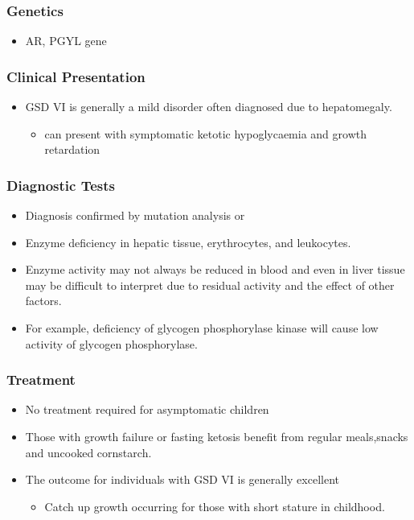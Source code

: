 \documentclass{scrartcl}
\begin{document}
\subsubsection{Genetics}
\label{sec:org5af2592}
\begin{itemize}
\item AR, PGYL gene
\end{itemize}

\subsubsection{Clinical Presentation}
\label{sec:org1d8daf8}
\begin{itemize}
\item GSD VI is generally a mild disorder often diagnosed due to hepatomegaly.
\begin{itemize}
\item can present with symptomatic ketotic hypoglycaemia and growth retardation
\end{itemize}
\end{itemize}
\subsubsection{Diagnostic Tests}
\label{sec:orgbe826e9}
\begin{itemize}
\item Diagnosis confirmed by mutation analysis or
\item Enzyme deficiency in hepatic tissue, erythrocytes, and leukocytes.
\item Enzyme activity may not always be reduced in blood and even in liver
tissue may be difficult to interpret due to residual activity and
the effect of other factors.
\item For example, deficiency of glycogen phosphorylase kinase will cause
low activity of glycogen phosphorylase.
\end{itemize}
\subsubsection{Treatment}
\label{sec:orged55460}
\begin{itemize}
\item No treatment required for asymptomatic children
\item Those with growth failure or fasting ketosis benefit from regular
meals,snacks and uncooked cornstarch.
\item The outcome for individuals with GSD VI is generally excellent
\begin{itemize}
\item Catch up growth occurring for those with short stature in childhood.
\end{itemize}
\end{itemize}
\end{document}
